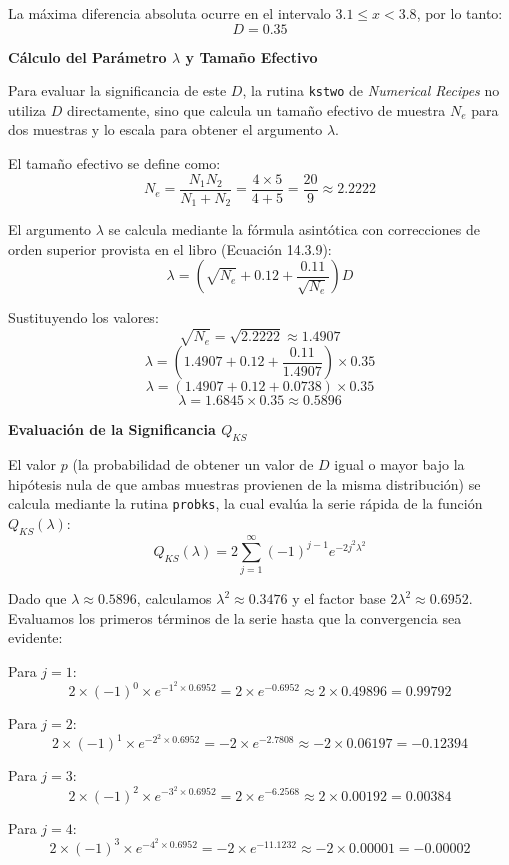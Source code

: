 \documentclass[a4paper]{article}
\begin{document}
La máxima diferencia absoluta ocurre en el intervalo $3.1 \leq x < 3.8$, por lo tanto:
$$ D = 0.35 $$

\textbf{Cálculo del Parámetro $\lambda$ y Tamaño Efectivo}

Para evaluar la significancia de este $D$, la rutina \texttt{kstwo} de \textit{Numerical Recipes} no utiliza $D$ directamente, sino que calcula un tamaño efectivo de muestra $N_e$ para dos muestras y lo escala para obtener el argumento $\lambda$. 

El tamaño efectivo se define como:
$$ N_e = \frac{N_1 N_2}{N_1 + N_2} = \frac{4 \times 5}{4 + 5} = \frac{20}{9} \approx 2.2222 $$

El argumento $\lambda$ se calcula mediante la fórmula asintótica con correcciones de orden superior provista en el libro (Ecuación 14.3.9):
$$ \lambda = \left( \sqrt{N_e} + 0.12 + \frac{0.11}{\sqrt{N_e}} \right) D $$

Sustituyendo los valores:
$$ \sqrt{N_e} = \sqrt{2.2222} \approx 1.4907 $$
$$ \lambda = \left( 1.4907 + 0.12 + \frac{0.11}{1.4907} \right) \times 0.35 $$
$$ \lambda = (1.4907 + 0.12 + 0.0738) \times 0.35 $$
$$ \lambda = 1.6845 \times 0.35 \approx 0.5896 $$

\textbf{Evaluación de la Significancia $Q_{KS}$}

El valor $p$ (la probabilidad de obtener un valor de $D$ igual o mayor bajo la hipótesis nula de que ambas muestras provienen de la misma distribución) se calcula mediante la rutina \texttt{probks}, la cual evalúa la serie rápida de la función $Q_{KS}(\lambda)$:
$$ Q_{KS}(\lambda) = 2 \sum_{j=1}^{\infty} (-1)^{j-1} e^{-2j^2\lambda^2} $$

Dado que $\lambda \approx 0.5896$, calculamos $\lambda^2 \approx 0.3476$ y el factor base $2\lambda^2 \approx 0.6952$. Evaluamos los primeros términos de la serie hasta que la convergencia sea evidente:

Para $j=1$:
$$ 2 \times (-1)^0 \times e^{-1^2 \times 0.6952} = 2 \times e^{-0.6952} \approx 2 \times 0.49896 = 0.99792 $$

Para $j=2$:
$$ 2 \times (-1)^1 \times e^{-2^2 \times 0.6952} = -2 \times e^{-2.7808} \approx -2 \times 0.06197 = -0.12394 $$

Para $j=3$:
$$ 2 \times (-1)^2 \times e^{-3^2 \times 0.6952} = 2 \times e^{-6.2568} \approx 2 \times 0.00192 = 0.00384 $$

Para $j=4$:
$$ 2 \times (-1)^3 \times e^{-4^2 \times 0.6952} = -2 \times e^{-11.1232} \approx -2 \times 0.00001 = -0.00002 $$
\end{document}
